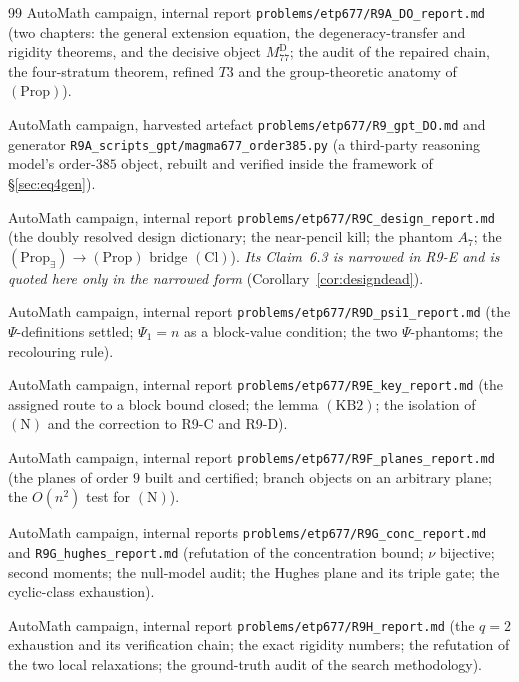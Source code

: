 \documentclass[11pt]{article}
\theoremstyle{plain}
\theoremstyle{definition}
\theoremstyle{remark}
\numberwithin{equation}{section}
\begin{document}
\begin{thebibliography}{99}
AutoMath campaign, internal report \texttt{problems\slash etp677\slash R9A\_DO\_report.md}
(two chapters: the general extension equation, the degeneracy-transfer and rigidity
theorems, and the decisive object $M_{77}^{\mathrm{D}}$; the audit of the repaired
chain, the four-stratum theorem, refined $T3$ and the group-theoretic anatomy of
$(\mathrm{Prop})$).

AutoMath campaign, harvested artefact
\texttt{problems\slash etp677\slash R9\_gpt\_DO.md} and generator
\texttt{R9A\_scripts\_gpt\slash magma677\_order385.py}
(a third-party reasoning model's order-$385$ object, rebuilt and verified inside
the framework of \S\ref{sec:eq4gen}).

AutoMath campaign, internal report \texttt{problems\slash etp677\slash R9C\_design\_report.md}
(the doubly resolved design dictionary; the near-pencil kill; the phantom $A_7$; the
$(\mathrm{Prop}_{\exists})\to(\mathrm{Prop})$ bridge $(\mathrm{Cl})$). \emph{Its Claim~6.3
is narrowed in R9-E and is quoted here only in the narrowed form}
(Corollary~\ref{cor:designdead}).

AutoMath campaign, internal report \texttt{problems\slash etp677\slash R9D\_psi1\_report.md}
(the $\Psi$-definitions settled; $\Psi_1 = n$ as a block-value condition; the two
$\Psi$-phantoms; the recolouring rule).

AutoMath campaign, internal report \texttt{problems\slash etp677\slash R9E\_key\_report.md}
(the assigned route to a block bound closed; the lemma $(\mathrm{KB2})$; the isolation of
$(\mathrm{N})$ and the correction to R9-C and R9-D).

AutoMath campaign, internal report \texttt{problems\slash etp677\slash R9F\_planes\_report.md}
(the planes of order $9$ built and certified; branch objects on an arbitrary plane; the
$O(n^2)$ test for $(\mathrm{N})$).

AutoMath campaign, internal reports
\texttt{problems\slash etp677\slash R9G\_conc\_report.md} and
\texttt{R9G\_hughes\_report.md}
(refutation of the concentration bound; $\nu$ bijective; second moments; the null-model
audit; the Hughes plane and its triple gate; the cyclic-class exhaustion).

AutoMath campaign, internal report \texttt{problems\slash etp677\slash R9H\_report.md}
(the $q = 2$ exhaustion and its verification chain; the exact rigidity numbers; the
refutation of the two local relaxations; the ground-truth audit of the search
methodology).


\end{thebibliography}
\end{document}
